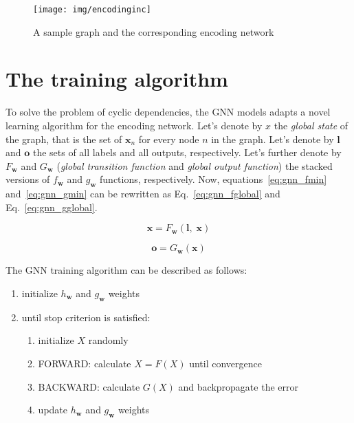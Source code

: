 \begin{figure}[h!]
\begin{center}
	\texttt{[image: img/encodinginc]}
	\caption{A sample graph and the corresponding encoding network}
	\label{fig:gnn_encoding}
\end{center}
\end{figure}


\section{The training algorithm}
To solve the problem of cyclic dependencies, the GNN models adapts a novel learning algorithm for the encoding network. Let's denote by $x$ the \emph{global state} of the graph, that is the set of $\bm{x}_n$ for every node $n$ in the graph. Let's denote by $\bm{l}$ and $\bm{o}$ the sets of all labels and all outputs, respectively. Let's further denote by $F_{\bm{w}}$ and $G_{\bm{w}}$ (\emph{global transition function} and \emph{global output function}) the stacked versions of $f_{\bm{w}}$ and $g_{\bm{w}}$ functions, respectively. Now, equations~\ref{eq:gnn_fmin} and~\ref{eq:gnn_gmin} can be rewritten as Eq.~\ref{eq:gnn_fglobal} and Eq.~\ref{eq:gnn_gglobal}.

\begin{equation}
\bm{x} = F_{\bm{w}}(\bm{l}, \; \bm{x})
\label{eq:gnn_fglobal}
\end{equation}

\begin{equation}
\bm{o} = G_{\bm{w}}(\bm{x})
\label{eq:gnn_gglobal}
\end{equation}

\noindent The GNN training algorithm can be described as follows:
\begin{enumerate}
	\item initialize $h_{\bm{w}}$ and $g_{\bm{w}}$ weights
	\item until stop criterion is satisfied:
	\begin{enumerate}
		\item initialize $X$ randomly
		\item FORWARD: calculate $X = F(X)$ until convergence
		\item BACKWARD: calculate $G(X)$ and backpropagate the error
		\item update $h_{\bm{w}}$ and $g_{\bm{w}}$ weights
	\end{enumerate}
\end{enumerate}



